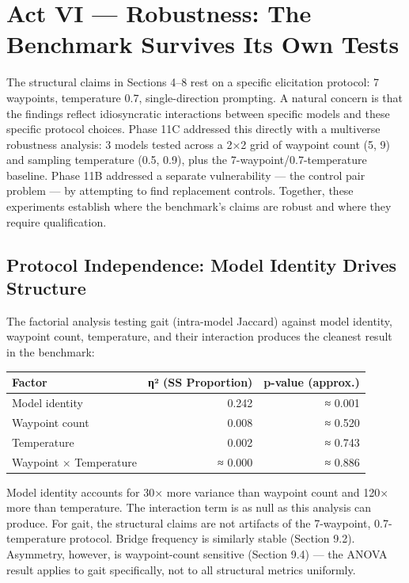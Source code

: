 \section{Act VI --- Robustness: The Benchmark Survives Its Own Tests}\label{act-vi-robustness-the-benchmark-survives-its-own-tests}

The structural claims in Sections 4--8 rest on a specific elicitation protocol: 7 waypoints, temperature 0.7, single-direction prompting. A natural concern is that the findings reflect idiosyncratic interactions between specific models and these specific protocol choices. Phase 11C addressed this directly with a multiverse robustness analysis: 3 models tested across a 2×2 grid of waypoint count (5, 9) and sampling temperature (0.5, 0.9), plus the 7-waypoint/0.7-temperature baseline. Phase 11B addressed a separate vulnerability --- the control pair problem --- by attempting to find replacement controls. Together, these experiments establish where the benchmark's claims are robust and where they require qualification.

\subsection{Protocol Independence: Model Identity Drives Structure}\label{protocol-independence-model-identity-drives-structure}

The factorial analysis testing gait (intra-model Jaccard) against model identity, waypoint count, temperature, and their interaction produces the cleanest result in the benchmark:

\begin{longtable}[]{@{}lrr@{}}
\toprule\noalign{}
Factor & η² (SS Proportion) & p-value (approx.) \\
\midrule\noalign{}
\endhead
\bottomrule\noalign{}
\endlastfoot
Model identity & 0.242 & ≈ 0.001 \\
Waypoint count & 0.008 & ≈ 0.520 \\
Temperature & 0.002 & ≈ 0.743 \\
Waypoint × Temperature & ≈ 0.000 & ≈ 0.886 \\
\end{longtable}

Model identity accounts for 30× more variance than waypoint count and 120× more than temperature. The interaction term is as null as this analysis can produce. For gait, the structural claims are not artifacts of the 7-waypoint, 0.7-temperature protocol. Bridge frequency is similarly stable (Section 9.2). Asymmetry, however, is waypoint-count sensitive (Section 9.4) --- the ANOVA result applies to gait specifically, not to all structural metrics uniformly.

